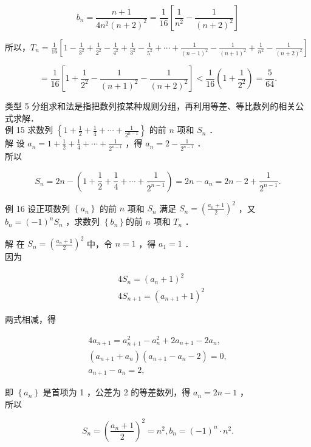 \documentclass[10pt]{article}
\begin{document}
\[
b_{n}=\frac{n+1}{4 n^{2}(n+2)^{2}}=\frac{1}{16}\left[\frac{1}{n^{2}}-\frac{1}{(n+2)^{2}}\right]
\]

所以，\(T_{n}=\frac{1}{16}\left[1-\frac{1}{3^{2}}+\frac{1}{2^{2}}-\frac{1}{4^{2}}+\frac{1}{3^{2}}-\frac{1}{5^{2}}+\cdots+\frac{1}{(n-1)^{2}}-\frac{1}{(n+1)^{2}}+\frac{1}{n^{2}}-\frac{1}{(n+2)^{2}}\right]\)

\[
=\frac{1}{16}\left[1+\frac{1}{2^{2}}-\frac{1}{(n+1)^{2}}-\frac{1}{(n+2)^{2}}\right]<\frac{1}{16}\left(1+\frac{1}{2^{2}}\right)=\frac{5}{64} .
\]

类型 5 分组求和法是指把数列按某种规则分组，再利用等差、等比数列的相关公式求解．\\
例 15 求数列 \(\left\{1+\frac{1}{2}+\frac{1}{4}+\cdots+\frac{1}{2^{n-1}}\right\}\) 的前 \(n\) 项和 \(S_{n}\) ．\\
解 设 \(a_{n}=1+\frac{1}{2}+\frac{1}{4}+\cdots+\frac{1}{2^{n-1}}\) ，得 \(a_{n}=2-\frac{1}{2^{n-1}}\) ．\\
所以

\[
S_{n}=2 n-\left(1+\frac{1}{2}+\frac{1}{4}+\cdots+\frac{1}{2^{n-1}}\right)=2 n-a_{n}=2 n-2+\frac{1}{2^{n-1}} .
\]

例 16 设正项数列 \(\left\{a_{n}\right\}\) 的前 \(n\) 项和 \(S_{n}\) 满足 \(S_{n}=\left(\frac{a_{n}+1}{2}\right)^{2}\) ，又 \(b_{n}=(-1)^{n} S_{n}\) ，求数列 \(\left\{b_{n}\right\}\)的前 \(n\) 项和 \(T_{n}\) ．

解 在 \(S_{n}=\left(\frac{a_{n}+1}{2}\right)^{2}\) 中，令 \(n=1\) ，得 \(a_{1}=1\) ．\\
因为

\[
\begin{aligned}
& 4 S_{n}=\left(a_{n}+1\right)^{2} \\
& 4 S_{n+1}=\left(a_{n+1}+1\right)^{2}
\end{aligned}
\]

两式相减，得

\[
\begin{gathered}
4 a_{n+1}=a_{n+1}^{2}-a_{n}^{2}+2 a_{n+1}-2 a_{n}, \\
\left(a_{n+1}+a_{n}\right)\left(a_{n+1}-a_{n}-2\right)=0, \\
a_{n+1}-a_{n}=2,
\end{gathered}
\]

即 \(\left\{a_{n}\right\}\) 是首项为 1 ，公差为 2 的等差数列，得 \(a_{n}=2 n-1\) ，\\
所以

\[
S_{n}=\left(\frac{a_{n}+1}{2}\right)^{2}=n^{2}, b_{n}=(-1)^{n} \cdot n^{2} .
\]
\end{document}
